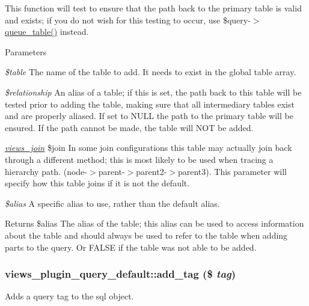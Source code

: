 This function will test to ensure that the path back to the primary table is valid and exists; if you do not wish for this testing to occur, use \$query-\/$>$\hyperlink{classviews__plugin__query__default_af3f53b356b6b979a0d511b14274a5bdb}{queue\_\-table()} instead.


\begin{DoxyParams}{Parameters}
\item[{\em \$table}]The name of the table to add. It needs to exist in the global table array. \item[{\em \$relationship}]An alias of a table; if this is set, the path back to this table will be tested prior to adding the table, making sure that all intermediary tables exist and are properly aliased. If set to NULL the path to the primary table will be ensured. If the path cannot be made, the table will NOT be added. \item[{\em \hyperlink{classviews__join}{views\_\-join}}]\$join In some join configurations this table may actually join back through a different method; this is most likely to be used when tracing a hierarchy path. (node-\/$>$parent-\/$>$parent2-\/$>$parent3). This parameter will specify how this table joins if it is not the default. \item[{\em \$alias}]A specific alias to use, rather than the default alias.\end{DoxyParams}
\begin{DoxyReturn}{Returns}
\$alias The alias of the table; this alias can be used to access information about the table and should always be used to refer to the table when adding parts to the query. Or FALSE if the table was not able to be added. 
\end{DoxyReturn}
\hypertarget{classviews__plugin__query__default_a7007bcb47f2ad6b03365c86cdad22b9c}{
\subsubsection[{add\_\-tag}]{\setlength{\rightskip}{0pt plus 5cm}views\_\-plugin\_\-query\_\-default::add\_\-tag (\$ {\em tag})}}
\label{classviews__plugin__query__default_a7007bcb47f2ad6b03365c86cdad22b9c}
Adds a query tag to the sql object.

